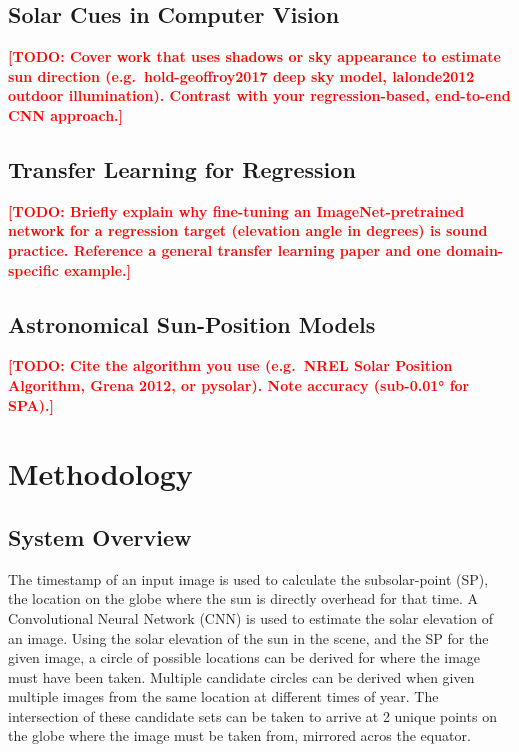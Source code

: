 \documentclass[conference]{IEEEtran}
\newcommand{\todo}[1]{\textcolor{red}{\textbf{[TODO: #1]}}}
\begin{document}
\subsection{Solar Cues in Computer Vision}
\todo{Cover work that uses shadows or sky appearance to estimate sun direction
(e.g.\ hold-geoffroy2017 deep sky model, lalonde2012 outdoor illumination).
Contrast with your regression-based, end-to-end CNN approach.}

\subsection{Transfer Learning for Regression}
\todo{Briefly explain why fine-tuning an ImageNet-pretrained network for a
regression target (elevation angle in degrees) is sound practice. Reference
a general transfer learning paper and one domain-specific example.}

\subsection{Astronomical Sun-Position Models}
\todo{Cite the algorithm you use (e.g.\ NREL Solar Position Algorithm,
Grena 2012, or pysolar). Note accuracy (sub-0.01° for SPA).}

\section{Methodology}

\subsection{System Overview}

The timestamp of an input image is used to calculate the subsolar-point (SP), the location on the globe where the sun is directly overhead for that time.
A Convolutional Neural Network (CNN) is used to estimate the solar elevation of an image. Using the solar elevation of the sun in the scene,
and the SP for the given image, a circle of possible locations can be derived for where the image must have been taken.
Multiple candidate circles can be derived when given multiple images from the same location at different times of year.
The intersection of these candidate sets can be taken to arrive at 2 unique points on the globe where the image must be taken from, mirrored acros the equator.
\end{document}
